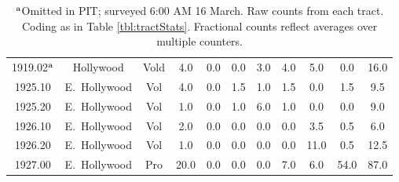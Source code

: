 \documentclass[11pt,twocolumn]{article}
\begin{document}
\begin{table}[t]
\begin{tabular}{ccccccccccc}
1919.02$^{\rm a}$ & Hollywood & Vold&  4.0 &  0.0 &  0.0 &  3.0 &  4.0 &  5.0 &  0.0 &  16.0 \\
1925.10 & E.~Hollywood & Vol &  4.0 &  0.0 &  1.5 &  1.0 &  1.5 &  0.0 &  1.5 &   9.5 \\
1925.20 & E.~Hollywood & Vol &  1.0 &  0.0 &  1.0 &  6.0 &  1.0 &  0.0 &  0.0 &   9.0 \\
1926.10 & E.~Hollywood & Vol &  2.0 &  0.0 &  0.0 &  0.0 &  0.0 &  3.5 &  0.5 &   6.0 \\
1926.20 & E.~Hollywood & Vol &  1.0 &  0.0 &  0.0 &  0.0 &  0.0 & 11.0 &  0.5 &  12.5 \\
1927.00 & E.~Hollywood & Pro & 20.0 &  0.0 &  0.0 &  0.0 &  7.0 &  6.0 & 54.0 &  87.0 \\
\bottomrule
\end{tabular}
\caption*{$^{\rm a}$Omitted in PIT; surveyed 6:00 AM 16 March. 
		Raw counts from each tract. Coding as in Table \ref{tbl:tractStats}. 
		Fractional counts reflect averages over multiple counters.}
\label{tbl:allCount}
\end{table}
\end{document}
